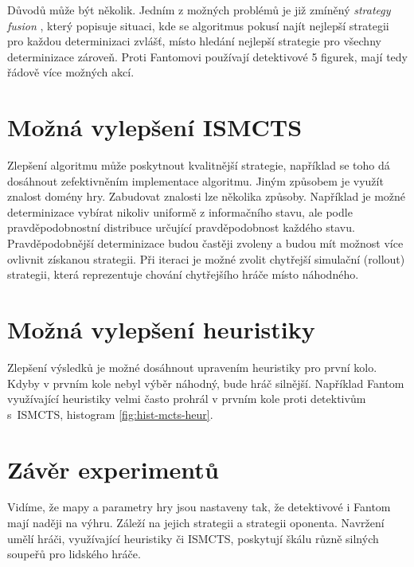 Důvodů může být několik. Jedním z možných problémů je již zmíněný {\it strategy fusion} \cite{Soete2013MonteCarloTS}, který popisuje situaci, kde se algoritmus pokusí najít nejlepší strategii pro každou determinizaci zvlášť, místo hledání nejlepší strategie pro všechny determinizace zároveň. Proti Fantomovi používají detektivové 5 figurek, mají tedy řádově více možných akcí.

\clearpage
\section{Možná vylepšení ISMCTS}

Zlepšení algoritmu může poskytnout kvalitnější strategie, například se toho dá dosáhnout zefektivněním implementace algoritmu. Jiným způsobem je využít znalost domény hry. Zabudovat znalosti lze několika způsoby. Například je možné determinizace vybírat nikoliv uniformě z informačního stavu, ale podle pravděpodobnostní distribuce určující pravděpodobnost každého stavu. Pravděpodobnější determinizace budou častěji zvoleny a budou mít možnost více ovlivnit získanou strategii. Při iteraci je možné zvolit chytřejší simulační (rollout) strategii, která reprezentuje chování chytřejšího hráče místo náhodného.  

\section{Možná vylepšení heuristiky}
Zlepšení výsledků je možné dosáhnout upravením heuristiky pro první kolo. Kdyby v prvním kole nebyl výběr náhodný, bude hráč silnější. Například Fantom využívající heuristiky velmi často prohrál v prvním kole proti detektivům s~ISMCTS, histogram \ref{fig:hist-mcts-heur}.

\section{Závěr experimentů}
Vidíme, že mapy a parametry hry jsou nastaveny tak, že detektivové i Fantom mají naději na výhru. Záleží na jejich strategii a strategii oponenta. Navržení umělí hráči, využívající heuristiky či ISMCTS, poskytují škálu různě silných soupeřů pro lidského hráče.  
